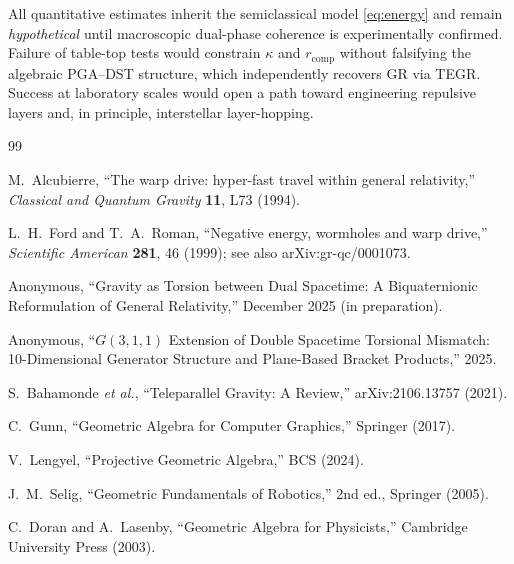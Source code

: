 \documentclass[dvipdfmx,a4paper]{article}
\theoremstyle{definition}
\begin{document}
All quantitative estimates inherit the semiclassical model \eqref{eq:energy} and remain \emph{hypothetical} until macroscopic dual-phase coherence is experimentally confirmed. Failure of table-top tests would constrain $\kappa$ and $r_{\mathrm{comp}}$ without falsifying the algebraic PGA--DST structure, which independently recovers GR via TEGR. Success at laboratory scales would open a path toward engineering repulsive layers and, in principle, interstellar layer-hopping.

\begin{thebibliography}{99}

M.~Alcubierre,
``The warp drive: hyper-fast travel within general relativity,''
\emph{Classical and Quantum Gravity} \textbf{11}, L73 (1994).

L.~H.~Ford and T.~A.~Roman,
``Negative energy, wormholes and warp drive,''
\emph{Scientific American} \textbf{281}, 46 (1999);
see also arXiv:gr-qc/0001073.

Anonymous,
``Gravity as Torsion between Dual Spacetime: A Biquaternionic Reformulation of General Relativity,''
December 2025 (in preparation).

Anonymous,
``\(G(3,1,1)\) Extension of Double Spacetime Torsional Mismatch: 10-Dimensional Generator Structure and Plane-Based Bracket Products,''
2025.

S.~Bahamonde \emph{et al.},
``Teleparallel Gravity: A Review,''
arXiv:2106.13757 (2021).

C.~Gunn,
``Geometric Algebra for Computer Graphics,''
Springer (2017).

V.~Lengyel,
``Projective Geometric Algebra,''
BCS (2024).

J.~M.~Selig,
``Geometric Fundamentals of Robotics,''
2nd ed., Springer (2005).

C.~Doran and A.~Lasenby,
``Geometric Algebra for Physicists,''
Cambridge University Press (2003).

\end{thebibliography}
\end{document}
